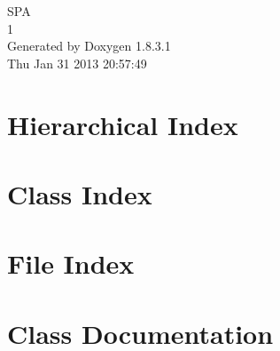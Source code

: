 \documentclass{book}
\begin{document}
\hypersetup{pageanchor=false,citecolor=blue}
\begin{titlepage}
\vspace*{7cm}
\begin{center}
{\Large S\-P\-A \\[1ex]\large 1 }\\
\vspace*{1cm}
{\large Generated by Doxygen 1.8.3.1}\\
\vspace*{0.5cm}
{\small Thu Jan 31 2013 20:57:49}\\
\end{center}
\end{titlepage}
\clearemptydoublepage
{}
\tableofcontents
\clearemptydoublepage
{}
\hypersetup{pageanchor=true,citecolor=blue}
\chapter{Hierarchical Index}

\chapter{Class Index}

\chapter{File Index}

\chapter{Class Documentation}


























\end{document}
